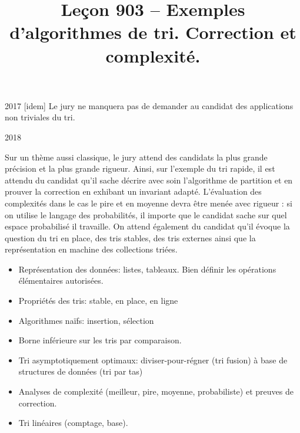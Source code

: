 \documentclass{agregfiche}
\title{Leçon 903 -- Exemples d'algorithmes de tri. Correction et complexité.}
\begin{document}
\maketitle

\secrapports

\begin{rapport}{2017}
    [idem]
    Le jury ne manquera pas de demander au candidat des applications non triviales du tri.
\end{rapport}

\begin{rapport}{2018}

Sur un thème aussi classique, le jury attend des candidats la plus grande précision et la plus grande rigueur.
Ainsi, sur l'exemple du tri rapide, il est attendu du candidat qu'il sache décrire avec soin l'algorithme de partition et en prouver la correction en exhibant un invariant adapté. L'évaluation des complexités dans le cas le pire et en moyenne devra être menée avec rigueur : si on utilise le langage des probabilités, il importe que le candidat sache sur quel espace probabilisé il travaille.
On attend également du candidat qu'il évoque la question du tri en place, des tris stables, des tris externes ainsi que la représentation en machine des collections triées.

\end{rapport}

\secindispensables

\begin{itemize}
    \item Représentation des données: listes, tableaux. Bien définir les opérations élémentaires autorisées.
    \item Propriétés des tris: stable, en place, en ligne
    \item Algorithmes naïfs: insertion, sélection
    \item Borne inférieure sur les tris par comparaison.
    \item Tri asymptotiquement optimaux: diviser-pour-régner (tri fusion) à base de structures de données (tri par tas)
    \item Analyses de complexité (meilleur, pire, moyenne, probabiliste) et preuves de correction.
    \item Tri linéaires (comptage, base).
\end{itemize}

\secidees
\end{document}

